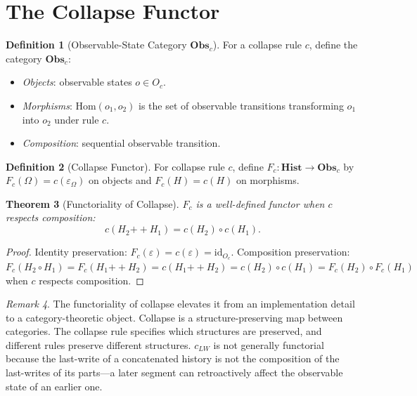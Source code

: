 \documentclass[12pt, a4paper, openany]{book}
\theoremstyle{plain}
\newtheorem{theorem}{Theorem}[chapter]
\theoremstyle{definition}
\newtheorem{definition}[theorem]{Definition}
\theoremstyle{remark}
\newtheorem{remark}[theorem]{Remark}
\newcommand{\Hist}{\mathbf{Hist}}
\newcommand{\Obs}{\mathbf{Obs}}
\begin{document}
\section{The Collapse Functor}

\begin{definition}[Observable-State Category $\Obs_c$]
For a collapse rule $c$, define the category $\Obs_c$:
\begin{itemize}
\item \textit{Objects}: observable states $o \in O_c$.
\item \textit{Morphisms}: $\mathrm{Hom}(o_1, o_2)$ is the set of observable
transitions transforming $o_1$ into $o_2$ under rule $c$.
\item \textit{Composition}: sequential observable transition.
\end{itemize}
\end{definition}

\begin{definition}[Collapse Functor]
For collapse rule $c$, define $F_c : \Hist \to \Obs_c$ by
$F_c(\Omega) = c(\varepsilon_\Omega)$ on objects and $F_c(H) = c(H)$ on morphisms.
\end{definition}

\begin{theorem}[Functoriality of Collapse]
$F_c$ is a well-defined functor when $c$ respects composition:
\[
c(H_2 \mathbin{++} H_1) = c(H_2) \circ c(H_1).
\]
\end{theorem}

\begin{proof}
Identity preservation: $F_c(\varepsilon) = c(\varepsilon) = \mathrm{id}_{O_c}$.
Composition preservation: $F_c(H_2 \circ H_1) = F_c(H_1 \mathbin{++} H_2) =
c(H_1 \mathbin{++} H_2) = c(H_2) \circ c(H_1) = F_c(H_2) \circ F_c(H_1)$ when
$c$ respects composition.
\end{proof}

\begin{remark}
The functoriality of collapse elevates it from an implementation detail to a
category-theoretic object. Collapse is a structure-preserving map between
categories. The collapse rule specifies which structures are preserved, and
different rules preserve different structures. $c_{LW}$ is not generally functorial
because the last-write of a concatenated history is not the composition of the
last-writes of its parts---a later segment can retroactively affect the observable
state of an earlier one.
\end{remark}
\end{document}
